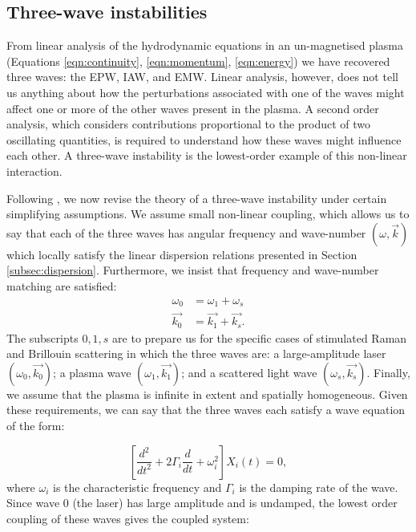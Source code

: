 \subsection{Three-wave instabilities}
From linear analysis of the hydrodynamic equations in an un-magnetised plasma (Equations \ref{eqn:continuity}, \ref{eqn:momentum}, \ref{eqn:energy}) we have recovered three waves: the \acrshort{EPW}, \acrshort{IAW}, and \acrshort{EMW}. Linear analysis, however, does not tell us anything about how the perturbations associated with one of the waves might affect one or more of the other waves present in the plasma. A second order analysis, which considers contributions proportional to the product of two oscillating quantities, is required to understand how these waves might influence each other. A three-wave instability is the lowest-order example of this non-linear interaction.


Following \citet{Nishikawa1976}, we now revise the theory of a three-wave instability under certain simplifying assumptions. We assume small non-linear coupling, which allows us to say that each of the three waves has angular frequency and wave-number $(\omega,\vec{k})$ which locally satisfy the linear dispersion relations presented in Section \ref{subsec:dispersion}. Furthermore, we insist that frequency and wave-number matching are satisfied:
\begin{subequations}\label{eqn:manley-rowe}
\begin{align}
\omega_0 &= \omega_1 + \omega_s \\
\vec{k_0} &= \vec{k_1} + \vec{k_s}.
\end{align}
\end{subequations} The subscripts $0,1,s$ are to prepare us for the specific cases of stimulated Raman and Brillouin scattering in which the three waves are: a large-amplitude laser $(\omega_0,\vec{k_0})$; a plasma wave $(\omega_1,\vec{k_1})$; and a scattered light wave $(\omega_s,\vec{k_s})$. Finally, we assume that the plasma is infinite in extent and spatially homogeneous. Given these requirements, we can say that the three waves each satisfy a wave equation of the form:

\begin{equation}
\left[ \frac{d^{2}}{d t^{2}}+2 \Gamma_{i} \frac{d}{d t}+\omega_{i}^{2} \right] X_{i}(t)=0,
\end{equation} where $\omega_i$ is the characteristic frequency and $\Gamma_i$ is the damping rate of the wave. Since wave 0 (the laser) has large amplitude and is undamped, the lowest order coupling of these waves gives the coupled system:

